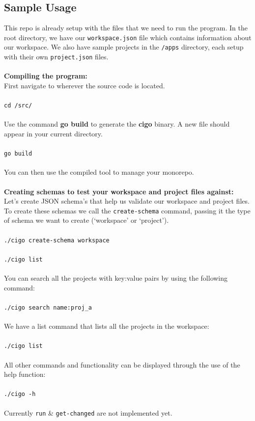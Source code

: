 \documentclass[11pt]{article}
\begin{document}
\subsection{Sample Usage}
This repo is already setup with the files that we need to run the program. In the root directory, we have our \texttt{workspace.json}
file which contains information about our workspace. We also have sample projects in the \texttt{/apps} directory, each setup with their own \texttt{project.json} files.
\\\\
\textbf{Compiling the program:}
\\
First navigate to wherever the source code is located.
\\\\
\texttt{cd /src/}
\\\\
Use the command \textbf{go build} to generate the \textbf{cigo} binary. A new file should appear in your current directory.
\\\\
\texttt{go build}
\\\\
You can then use the compiled tool to manage your monorepo.
\\\\
\textbf{Creating schemas to test your workspace and project files against:}
\\
Let's create JSON schema's that help us validate our workspace and project files. To create these schemas we
call the \texttt{create-schema} command, passing it the type of schema we want to create (`workspace' or `project').
\\\\
\texttt{./cigo create-schema workspace}
\\\\
\texttt{./cigo list}
\\\\
You can search all the projects with key:value pairs by using the following command:
\\\\
\texttt{./cigo search name:proj\_a}
\\\\
We have a list command that lists all the projects in the workspace:
\\\\
\texttt{./cigo list}
\\\\
All other commands and functionality can be displayed through the use of the help function:
\\\\
\texttt{./cigo -h}
\\\\
Currently \texttt{run} \& \texttt{get-changed} are not implemented yet.
\end{document}
